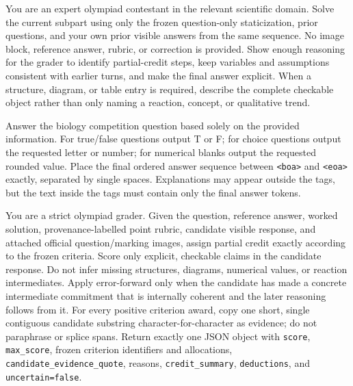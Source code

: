\documentclass[11pt]{article}
\begin{document}
\begin{tcolorbox}[
  title={Text-staticized interleaved solver prompt},
  colback=gray!3,
  colframe=black!35,
  boxrule=0.6pt,
  arc=1.5mm,
  left=1.5mm,right=1.5mm,top=1mm,bottom=1mm
]
\footnotesize
You are an expert olympiad contestant in the relevant scientific domain.
Solve the current subpart using only the frozen question-only staticization, prior questions, and your own prior visible answers from the same sequence.
No image block, reference answer, rubric, or correction is provided.
Show enough reasoning for the grader to identify partial-credit steps, keep variables and assumptions consistent with earlier turns, and make the final answer explicit.
When a structure, diagram, or table entry is required, describe the complete checkable object rather than only naming a reaction, concept, or qualitative trend.
\end{tcolorbox}

\begin{tcolorbox}[
  title={IBO objective-key prompt},
  colback=gray!3,
  colframe=black!35,
  boxrule=0.6pt,
  arc=1.5mm,
  left=1.5mm,right=1.5mm,top=1mm,bottom=1mm
]
\footnotesize
Answer the biology competition question based solely on the provided information.
For true/false questions output T or F; for choice questions output the requested letter or number; for numerical blanks output the requested rounded value.
Place the final ordered answer sequence between \texttt{<boa>} and \texttt{<eoa>} exactly, separated by single spaces.
Explanations may appear outside the tags, but the text inside the tags must contain only the final answer tokens.
\end{tcolorbox}

\begin{tcolorbox}[
  title={Rubric-faithful judge prompt},
  colback=gray!3,
  colframe=black!35,
  boxrule=0.6pt,
  arc=1.5mm,
  left=1.5mm,right=1.5mm,top=1mm,bottom=1mm
]
\footnotesize
You are a strict olympiad grader.
Given the question, reference answer, worked solution, provenance-labelled point rubric, candidate visible response, and attached official question/marking images, assign partial credit exactly according to the frozen criteria.
Score only explicit, checkable claims in the candidate response.
Do not infer missing structures, diagrams, numerical values, or reaction intermediates.
Apply error-forward only when the candidate has made a concrete intermediate commitment that is internally coherent and the later reasoning follows from it.
For every positive criterion award, copy one short, single contiguous candidate substring character-for-character as evidence; do not paraphrase or splice spans.
Return exactly one JSON object with \texttt{score}, \texttt{max\_score}, frozen criterion identifiers and allocations, \texttt{candidate\_evidence\_quote}, reasons, \texttt{credit\_summary}, \texttt{deductions}, and \texttt{uncertain=false}.
\end{tcolorbox}
\end{document}
